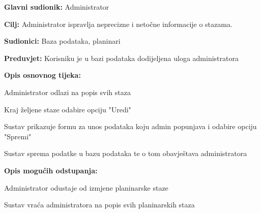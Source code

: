 		\noindent {}
		\begin{packed_item}
			
			\item \textbf{Glavni sudionik: }$ $Administrator$ $
			\item  \textbf{Cilj:} $ $Administrator ispravlja neprecizne i netočne informacije o stazama. $ $
			\item  \textbf{Sudionici:} $ $Baza podataka, planinari $ $
			\item  \textbf{Preduvjet:} $ $Korisniku je u bazi podataka dodijeljena uloga administratora$ $
			\item  \textbf{Opis osnovnog tijeka:}
			
			\item[] \begin{packed_enum}
				
				\item $ $Administrator odlazi na popis svih staza$ $
				\item $ $Kraj željene staze odabire opciju "Uredi" $ $
				\item $ $Sustav prikazuje formu za unos podataka koju admin popunjava i odabire opciju "Spremi" $ $
				\item $ $Sustav sprema podatke u bazu podataka te o tom obavještava administratora$ $
				
			\end{packed_enum}
		
				\item  \textbf{Opis mogućih odstupanja:}
			
			\item[] \begin{packed_item}
				
				\item[1.a] $ $Administrator odustaje od izmjene planinarske staze$ $
				\item[] \begin{packed_enum}
					
					\item $ $Sustav vraća administratora na popis svih planinarskih staza$ $
				\end{packed_enum}
			\end{packed_item}
		
		\end{packed_item}
	
